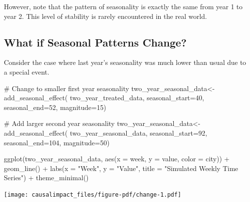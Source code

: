 \documentclass[
  letterpaper,
  DIV=11,
  numbers=noendperiod]{scrreprt}
\newenvironment{Shaded}{\begin{snugshade}}{\end{snugshade}}
\newcommand{\AttributeTok}[1]{\textcolor[rgb]{0.40,0.45,0.13}{#1}}
\newcommand{\CommentTok}[1]{\textcolor[rgb]{0.37,0.37,0.37}{#1}}
\newcommand{\DecValTok}[1]{\textcolor[rgb]{0.68,0.00,0.00}{#1}}
\newcommand{\FunctionTok}[1]{\textcolor[rgb]{0.28,0.35,0.67}{#1}}
\newcommand{\NormalTok}[1]{\textcolor[rgb]{0.00,0.23,0.31}{#1}}
\newcommand{\OtherTok}[1]{\textcolor[rgb]{0.00,0.23,0.31}{#1}}
\newcommand{\SpecialCharTok}[1]{\textcolor[rgb]{0.37,0.37,0.37}{#1}}
\newcommand{\StringTok}[1]{\textcolor[rgb]{0.13,0.47,0.30}{#1}}
\begin{document}
However, note that the pattern of seasonality is exactly the same from
year 1 to year 2. This level of stability is rarely encountered in the
real world.

\subsection{What if Seasonal Patterns
Change?}\label{what-if-seasonal-patterns-change}

Consider the case where last year's seasonality was much lower than
usual due to a special event.

\begin{Shaded}
\begin{Highlighting}[]
\CommentTok{\# Change to smaller first year seasonality}
\NormalTok{two\_year\_seasonal\_data}\OtherTok{\textless{}{-}}\FunctionTok{add\_seasonal\_effect}\NormalTok{(}
\NormalTok{  two\_year\_treated\_data,}
  \AttributeTok{seasonal\_start=}\DecValTok{40}\NormalTok{,}
  \AttributeTok{seasonal\_end=}\DecValTok{52}\NormalTok{,}
  \AttributeTok{magnitude=}\DecValTok{15}\NormalTok{)}

\CommentTok{\# Add larger second year seasonality}
\NormalTok{two\_year\_seasonal\_data}\OtherTok{\textless{}{-}}\FunctionTok{add\_seasonal\_effect}\NormalTok{(}
\NormalTok{  two\_year\_seasonal\_data,}
  \AttributeTok{seasonal\_start=}\DecValTok{92}\NormalTok{,}
  \AttributeTok{seasonal\_end=}\DecValTok{104}\NormalTok{,}
  \AttributeTok{magnitude=}\DecValTok{50}\NormalTok{)}


\FunctionTok{ggplot}\NormalTok{(two\_year\_seasonal\_data, }\FunctionTok{aes}\NormalTok{(}\AttributeTok{x =}\NormalTok{ week, }\AttributeTok{y =}\NormalTok{ value, }\AttributeTok{color =}\NormalTok{ city)) }\SpecialCharTok{+}
  \FunctionTok{geom\_line}\NormalTok{() }\SpecialCharTok{+}
  \FunctionTok{labs}\NormalTok{(}\AttributeTok{x =} \StringTok{"Week"}\NormalTok{, }\AttributeTok{y =} \StringTok{"Value"}\NormalTok{, }\AttributeTok{title =} \StringTok{"Simulated Weekly Time Series"}\NormalTok{) }\SpecialCharTok{+}
  \FunctionTok{theme\_minimal}\NormalTok{()}
\end{Highlighting}
\end{Shaded}

\texttt{[image: causalimpact\_files/figure-pdf/change-1.pdf]}

\begin{Shaded}
\end{Shaded}
\end{document}
